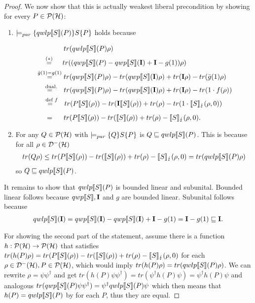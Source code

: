 \documentclass[a4paper,UKenglish,cleveref, autoref, thm-restate]{lipics-v2021}
\begin{document}
\begin{proof}
    We now show that this is actually weakest liberal precondition by showing for every $P\in \mathcal{P}(\mathcal{H})$:
    \begin{enumerate}
        \item $\models_{par}\{qwlp\llbracket S \rrbracket (P)\} S \{P\}$ holds because \begin{align*}
            &\phantom{\overset{\Bar{g}(1) = g(1)}{=}.}tr(\qwlp{S}{P}\rho) \\
            &\overset{\phantom{..a.}(*)\phantom{.a..}}{=} tr ((\qwp{S}{P} - \qwp{S}{\identityOp} + \identityOp - g(1)) \rho) \\
            &\overset{\Bar{g}(1) = g(1)}{=} tr(\qwp{S}{P}\rho) - tr(\qwp{S}{\identityOp}\rho) + tr(\identityOp\rho) - tr(\Bar{g}(1)\rho)\\
            &\overset{\phantom{aa.}\text{dual.}\phantom{a.}}{=} tr(\qwp{S}{P}\rho) - tr(\qwp{S}{\identityOp}\rho) + tr(\identityOp\rho) - tr(1 \cdot f(\rho))\\
            &\overset{\phantom{..a.}\text{def }f\phantom{.a}}{=} tr(P\semantics{S}(\rho)) - tr(\identityOp \semantics{S}(\rho)) + tr(\rho) - tr(1\cdot \semanticsErr{S}(\rho,0))\\
            &\overset{\phantom{\Bar{g}(1) = g(1)}}{=} tr(P \semantics{S}(\rho)) - tr(\semantics{S}(\rho)) + tr(\rho) - \semanticsErr{S}(\rho,0).
        \end{align*}
        \item For any $Q\in \mathcal{P}(\mathcal{H})$ with $\models_{par}\{Q\} S \{P\}$ is $Q\sqsubseteq qwlp\llbracket S \rrbracket (P)$. This is because for all $\rho \in \mathcal{D}^- (\mathcal{H})$ \begin{align*}
            tr(Q\rho) \leq tr(P \llbracket S \rrbracket(\rho)) - tr(\llbracket S \rrbracket(\rho)) + tr(\rho) - \llbracket S \rrbracket_{\lightning}(\rho,0) = tr(qwlp\llbracket S \rrbracket (P)\rho)
        \end{align*}
        so $Q \sqsubseteq qwlp\llbracket S \rrbracket (P)$.
    \end{enumerate}

    It remains to show that $qwlp\llbracket S \rrbracket (P)$ is bounded linear and subunital. Bounded linear follows because $qwp\llbracket S \rrbracket, \textbf{I}$ and $g$ are bounded linear. Subunital follows because
    \begin{align*}
        qwlp\llbracket S \rrbracket (\textbf{I}) = qwp\llbracket S \rrbracket (\textbf{I}) - qwp\llbracket S \rrbracket (\textbf{I}) + \textbf{I} - g(1) = \textbf{I} - g(1) \sqsubseteq \textbf{I}.
    \end{align*}

    For showing the second part of the statement, assume there is a function $h:\mathcal{P}(\mathcal{H}) \to \mathcal{P}(\mathcal{H})$ that satisfies $tr(h(P)\rho) = tr(P \llbracket S \rrbracket(\rho)) - tr(\llbracket S \rrbracket(\rho)) + tr(\rho) - \llbracket S \rrbracket_{\lightning}(\rho,0)$ for each $\rho \in \mathcal{D}^- (\mathcal{H}), P\in \mathcal{P}(\mathcal{H})$, which would imply $tr(h(P)\rho)=tr(qwlp\llbracket S \rrbracket (P)\rho)$. We can rewrite $\rho=\psi \psi^\dagger$ and get $tr(h(P)\psi \psi^\dagger)=tr(\psi^\dagger h(P)\psi) = \psi^\dagger h(P)\psi$ and analogous $tr(qwp\llbracket S \rrbracket (P)\psi \psi^\dagger) = \psi^\dagger qwlp\llbracket S \rrbracket (P)\psi$ which then means that $h(P)= qwlp\llbracket S \rrbracket (P)$ by \cite[Chapter II, Proposition 2.15]{conway1994} for each $P$, thus they are equal.
\end{proof}
\end{document}
